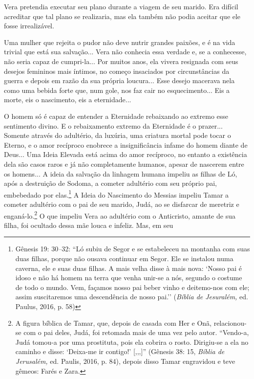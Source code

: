 Vera pretendia executar seu plano durante a viagem de seu marido. Era
difícil acreditar que tal plano se realizaria, mas ela também não podia
aceitar que ele fosse irrealizável.

Uma mulher que rejeita o pudor não deve nutrir grandes paixões, e é na
vida trivial que está sua salvação... Vera não conhecia essa verdade e,
se a conhecesse, não seria capaz de cumpri-la... Por muitos anos, ela
vivera resignada com seus desejos femininos mais íntimos, no começo
insaciados por circunstâncias da guerra e depois em razão da sua própria
loucura... Esse desejo macerava nela como uma bebida forte que, num
gole, nos faz cair no esquecimento... Eis a morte, eis o nascimento, eis
a eternidade...

O homem só é capaz de entender a Eternidade rebaixando ao extremo esse
sentimento divino. E o rebaixamento extremo da Eternidade é o prazer...
Somente através do adultério, da luxúria, uma criatura mortal pode tocar
o Eterno, e o amor recíproco enobrece a insignificância infame do homem
diante de Deus... Uma Ideia Elevada está acima do amor recíproco, no
entanto a existência dela são casos raros e já não completamente
humanos, apesar de nascerem entre os homens... A ideia da salvação da
linhagem humana impeliu as filhas de Ló, após a destruição de Sodoma, a
cometer adultério com seu próprio pai, embebedado por elas.\footnote{Gênesis
  19: 30\emph{--}32: ``Ló subiu de Segor e se estabeleceu na montanha
  com suas duas filhas, porque não ousava continuar em Segor. Ele se
  instalou numa caverna, ele e suas duas filhas. A mais velha disse à
  mais nova: `Nosso pai é idoso e não há homem na terra que venha
  unir-se a nós, segundo o costume de todo o mundo. Vem, façamos nosso
  pai beber vinho e deitemo-nos com ele; assim suscitaremos uma
  descendência de nosso pai.'' (\emph{Bíblia de Jesuralém,} ed. Paulus,
  2016, p. 58)} A Ideia do Nascimento do Messias impeliu Tamar a cometer
adultério com o pai de seu marido, Judá, ao se disfarcar de meretriz e
enganá-lo.\footnote{A figura bíblica de Tamar, que, depois de casada com
  Her e Onã, relacionou-se com o pai deles, Judá, foi retomada mais de
  uma vez pelo autor. ``Vendo-a, Judá tomou-a por uma prostituta, pois
  ela cobrira o rosto. Dirigiu-se a ela no caminho e disse: `Deixa-me ir
  contigo!' {[},,,{]}'' (Gênesis 38: 15, \emph{Bíblia de Jerusalém,} ed.
  Paulis, 2016, p. 84), depois disso Tamar engravidou e teve gêmeos:
  Farés e Zara.} O que impeliu Vera ao adultério com o Anticristo,
amante de sua filha, foi ocultado dessa mãe louca e infeliz. Mas, em seu
